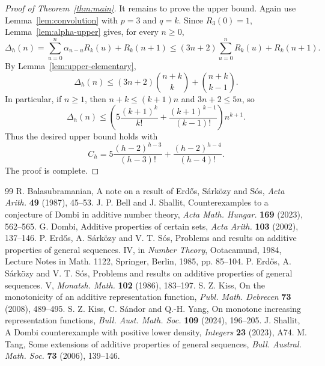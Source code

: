 \documentclass[10pt,a4paper]{amsart}
\begin{document}
\begin{proof}[Proof of Theorem~\ref{thm:main}]
It remains to prove the upper bound. Again use Lemma~\ref{lem:convolution} with $p=3$ and $q=k$. Since $R_3(0)=1$, Lemma~\ref{lem:alpha-upper} gives, for every $n\ge 0$,
\[
\Delta_h(n)=\sum_{u=0}^n \alpha_{n-u}R_k(u)+R_k(n+1)
\le (3n+2)\sum_{u=0}^n R_k(u)+R_k(n+1).
\]
By Lemma~\ref{lem:upper-elementary},
\begin{equation}\label{eq:upper-binomial}
\Delta_h(n)\le (3n+2)\binom{n+k}{k}+\binom{n+k}{k-1}.
\end{equation}
In particular, if $n\ge 1$, then $n+k\le (k+1)n$ and $3n+2\le 5n$, so
\[
\Delta_h(n)\le \left(5\frac{(k+1)^k}{k!}+\frac{(k+1)^{k-1}}{(k-1)!}\right)n^{k+1}.
\]
Thus the desired upper bound holds with
\[
C_h=5\frac{(h-2)^{h-3}}{(h-3)!}+\frac{(h-2)^{h-4}}{(h-4)!}.
\]
The proof is complete.
\end{proof}


\begin{thebibliography}{99}
 R. Balasubramanian, A note on a result of Erd\H{o}s, S\'{a}rk\"{o}zy and S\'{o}s, \emph{Acta Arith.} \textbf{49} (1987), 45--53.
 J. P. Bell and J. Shallit, Counterexamples to a conjecture of Dombi in additive number theory, \emph{Acta Math. Hungar.} \textbf{169} (2023), 562--565.
 G. Dombi, Additive properties of certain sets, \emph{Acta Arith.} \textbf{103} (2002), 137--146.
 P. Erd\H{o}s, A. S\'{a}rk\"{o}zy and V. T. S\'{o}s, Problems and results on additive properties of general sequences. IV, in \emph{Number Theory}, Ootacamund, 1984, Lecture Notes in Math. 1122, Springer, Berlin, 1985, pp. 85--104.
 P. Erd\H{o}s, A. S\'{a}rk\"{o}zy and V. T. S\'{o}s, Problems and results on additive properties of general sequences. V, \emph{Monatsh. Math.} \textbf{102} (1986), 183--197.
 S. Z. Kiss, On the monotonicity of an additive representation function, \emph{Publ. Math. Debrecen} \textbf{73} (2008), 489--495.
 S. Z. Kiss, C. S\'{a}ndor and Q.-H. Yang, On monotone increasing representation functions, \emph{Bull. Aust. Math. Soc.} \textbf{109} (2024), 196--205.
 J. Shallit, A Dombi counterexample with positive lower density, \emph{Integers} \textbf{23} (2023), A74.
 M. Tang, Some extensions of additive properties of general sequences, \emph{Bull. Austral. Math. Soc.} \textbf{73} (2006), 139--146.
\end{thebibliography}
\end{document}
